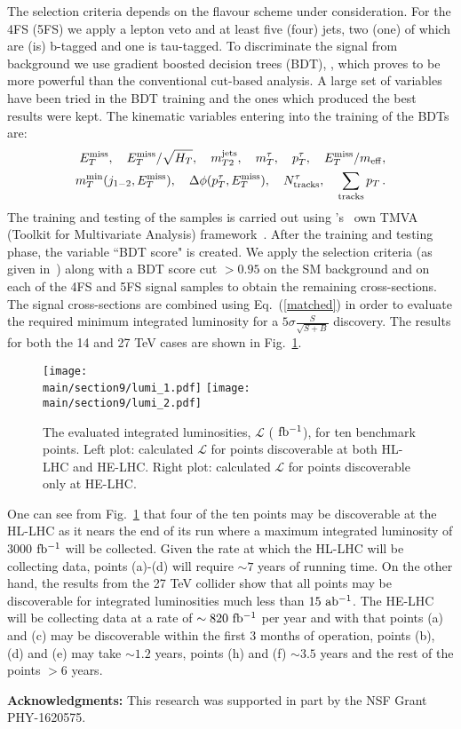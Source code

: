 The selection criteria depends on the flavour scheme under consideration. For the 4FS (5FS) we apply a lepton veto and at least five (four) jets, two (one) of which are (is) b-tagged and one is tau-tagged. To discriminate the signal from background we use gradient boosted decision trees (BDT), , which proves to be more powerful than the conventional cut-based analysis. A large set of variables have been tried in the BDT training and the ones which produced the best results were kept. The kinematic variables entering into the training of the BDTs are: 
\begin{align}
E^{\rm miss}_T, ~~~ E^{\rm miss}_T/\sqrt{H_T}, ~~~m_{T2}^{\rm jets}, ~~~m_T^{\tau}, ~~~p_T^{\tau}, ~~~E^{\rm miss}_T/m_{\rm eff},  \nonumber \\
m_T^{\rm min}(j_{1-2},E^{\rm miss}_T), ~~~\Delta\phi(p^{\tau}_T,E^{\rm miss}_T), ~~~N_{\rm tracks}^{\tau}, ~~~\sum_{\rm tracks} p_T \, .
\end{align}
The training and testing of the samples is carried out using 's~\cite{Antcheva:2011zz} own TMVA (Toolkit for Multivariate Analysis) framework~\cite{Speckmayer:2010zz}. After the training and testing phase, the variable ``BDT score" is created. We apply the selection criteria (as given in~\cite{Aboubrahim:2018tpf}) along with a BDT score cut $>0.95$ on the SM background and on each of the 4FS and 5FS signal samples to obtain the remaining cross-sections. The signal cross-sections are combined using Eq.~(\ref{matched}) in order to evaluate the required minimum integrated luminosity for a $5\sigma \frac{S}{\sqrt{S+B}}$ discovery. The results for both the 14 and 27 TeV cases are shown in Fig.~\ref{fig1}. 

\begin{figure}[H]
 \centering
   \texttt{[image: \\main/section9/lumi\_1.pdf]} 
      \texttt{[image: \\main/section9/lumi\_2.pdf]}
   \caption{The evaluated integrated luminosities, $\mathcal{L}$ ($\rm~fb^{-1}$), for ten benchmark points. Left plot: calculated $\mathcal{L}$ for points discoverable at both HL-LHC and HE-LHC. Right plot: calculated $\mathcal{L}$ for points discoverable only at HE-LHC.}
	\label{fig1}
\end{figure}

One can see from Fig.~\ref{fig1} that four of the ten points may be discoverable at the HL-LHC as it nears the end of its run where a maximum integrated luminosity of 3000$\rm~fb^{-1}$ will be collected. Given the rate at which the HL-LHC will be collecting data, points (a)-(d) will require $\sim 7$ years of running time. On the other hand, the results from the 27 TeV collider show that all points may be discoverable for integrated luminosities much less than $15\rm~ab^{-1}$. The HE-LHC will be collecting data at a rate of $\sim 820\rm~fb^{-1}$ per year and with that points (a) and (c) may be discoverable within the first 3 months of operation, points (b), (d) and (e) may take $\sim 1.2$ years, points (h) and (f) $\sim 3.5$ years and the rest of the points $>6$ years.  


\textbf{Acknowledgments:}
This research was supported in part by the NSF Grant PHY-1620575.
